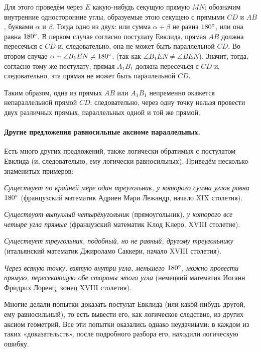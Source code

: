 \documentclass[twoside]{book}
\begin{document}
Для этого проведём через $E$ какую-нибудь секущую прямую $MN$;
обозначим внутренние односторонние углы, образуемые этою секущею
с прямыми $CD$ и $AB$, буквами $\alpha$ и $\beta$.
Тогда одно из двух: или сумма $\alpha+\beta$ не равна $180\degree$,
или она равна $180\degree$.
В первом случае согласно постулату Евклида,
прямая $AB$ должна пересечься с $CD$ и, следовательно, она не может быть параллельной $CD$. 
Во втором случае $\alpha+\angle B_1EN\ne 180\degree$, (так как $\angle B_1EN\ne \angle BEN$).
Значит, тогда, согласно тому же постулату, прямая $A_1B_1$ должна пересечься
с $CD$ и, следовательно, эта прямая не может быть параллельной
$CD$.

Таким образом, одна из прямых $AB$ или $A_1B_1$ непременно окажется непараллельной прямой $CD$; следовательно, через одну точку нельзя провести двух различных прямых, параллельных одной и той же прямой.

\paragraph{Другие предложения равносильные аксиоме параллельных.}\label{1914/92}
Есть много других предложений, также логически обратимых с постулатом Евклида (и, следовательно, ему логически равносильных).
Приведём несколько знаменитых примеров:

\emph{Существует по крайней мере один треугольник, у которого сумма углов равна $180\degree$} (французский математик Адриен Мари Лежандр, начало XIX столетия).

\emph{Существуот выпуклый четырёхугольник} (прямоугольник), \emph{у которого все четыре угла прямые} (французский математик Kлод  Kлеро, XVIII столетие).

\emph{Существует треугольник, подобный, но не равный, другому треугольнику} (итальянский математик Джироламо Саккери, начало XVIII столетия).

\emph{Через всякую точку, взятую внутри угла, меньшего $180\degree$, можно
провести прямую, пересекающую обе стороны этого угла} (немецкий
математик Иоганн Фридрих Лоренц, конец XVIII столетия).

{\sloppy

Многие делали попытки доказать постулат Евклида
(или какой-нибудь другой, ему равносильный), то есть вывести его,
как логическое следствие, из других аксиом геометрий.
Все эти попытки оказались однако неудачиыми: в каждом из таких «доказательств», после подробного разбора его, находили логическую ошибку.

}
\end{document}
